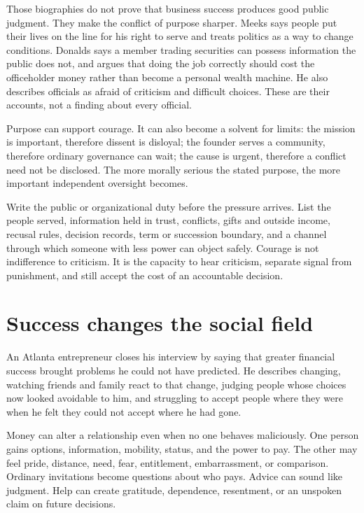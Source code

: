 Those biographies do not prove that business success produces good public
judgment. They make the conflict of purpose sharper. Meeks says people put
their lives on the line for his right to serve and treats politics as a way to
change conditions. Donalds says a member trading securities can possess
information the public does not, and argues that doing the job correctly
should cost the officeholder money rather than become a personal wealth
machine. He also describes officials as afraid of criticism and difficult
choices. These are their accounts, not a finding about every official.

Purpose can support courage. It can also become a solvent for limits: the
mission is important, therefore dissent is disloyal; the founder serves a
community, therefore ordinary governance can wait; the cause is urgent,
therefore a conflict need not be disclosed. The more morally serious the
stated purpose, the more important independent oversight becomes.

Write the public or organizational duty before the pressure arrives. List the
people served, information held in trust, conflicts, gifts and outside income,
recusal rules, decision records, term or succession boundary, and a channel
through which someone with less power can object safely. Courage is not
indifference to criticism. It is the capacity to hear criticism, separate
signal from punishment, and still accept the cost of an accountable decision.

\section{Success changes the social field}

An Atlanta entrepreneur closes his interview by saying that greater financial
success brought problems he could not have predicted. He describes changing,
watching friends and family react to that change, judging people whose choices
now looked avoidable to him, and struggling to accept people where they were
when he felt they could not accept where he had gone.

Money can alter a relationship even when no one behaves maliciously. One
person gains options, information, mobility, status, and the power to pay. The
other may feel pride, distance, need, fear, entitlement, embarrassment, or
comparison. Ordinary invitations become questions about who pays. Advice can
sound like judgment. Help can create gratitude, dependence, resentment, or an
unspoken claim on future decisions.

